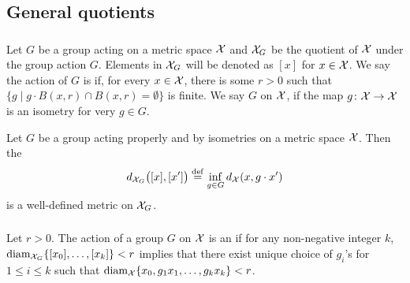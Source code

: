 
\subsection{General quotients}

\subsubsection{}


Let $G$ be a group acting on a metric space $\mathcal{X}$ and $\mathcal{X}_G$ be the quotient of $\mathcal{X}$ under the group action $G$.
Elements in $\mathcal{X}_G$ will be denoted as $[x]$ for $x \in \mathcal{X}$.
We say the action of $G$ is  if, for every $x \in \mathcal{X}$, there is some $r>0$ such that $\{g \mid g\cdot B(x,r) \cap B(x,r) = \emptyset\}$ is finite.
We say $G$  on $\mathcal{X}$, if the map $g \colon \mathcal{X} \to \mathcal{X}$ is an isometry for very $g \in G$.

Let $G$ be a group acting properly and by isometries on a metric space $\mathcal{X}$.
Then the 
\[
d_{\mathcal{X}_G}\big([x], [x']\big) \stackrel{\mathrm{def}}{=} \inf_{g\in G} d_{\mathcal{X}}(x, g\cdot x')
\]
is a well-defined metric on $\mathcal{X}_G$.

\subsubsection{}

Let $r>0$.
The action of a group $G$ on $\mathcal{X}$ is an  if for any non-negative integer $k$, $\operatorname{diam}_{\mathcal{X}_G}\{[x_0],\dots,[x_k]\}<r$ implies that there exist unique choice of $g_i$'s for $1\leq i\leq k$ such that $\operatorname{diam}_{\mathcal{X}}\{x_0,g_1x_1,\dots,g_kx_k\}<r$.

\subsubsection{}\label{subsub:h}

